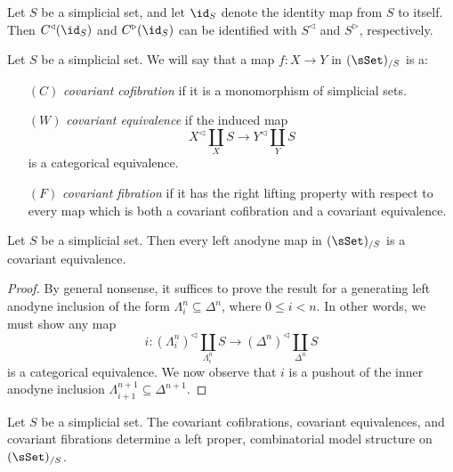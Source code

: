 \begin{example}
Let $S$ be a simplicial set, and let $\id_{S}$ denote the identity map from $S$ to itself.
Then $C^{\triangleleft}(\id_S)$ and $C^{\triangleright}(\id_S)$ can be identified with
$S^{\triangleleft}$ and $S^{\triangleright}$, respectively.
\end{example}

\begin{definition}
Let $S$ be a simplicial set. We will say that a map $f: X \rightarrow Y$ in $(\sSet)_{/S}$ is
a:
\begin{itemize}
\item[$(C)$] {\it covariant cofibration} if it is a monomorphism of simplicial sets.
\item[$(W)$] {\it covariant equivalence} if the induced map
$$ X^{\triangleleft} \coprod_{X} S \rightarrow Y^{\triangleleft} \coprod_{Y} S $$
is a categorical equivalence.
\item[$(F)$] {\it covariant fibration} if it has the right lifting property with respect to every map
which is both a covariant cofibration and a covariant equivalence.
\end{itemize}
\end{definition}

\begin{lemma}\label{onehalff}
Let $S$ be a simplicial set. Then every left anodyne map in $(\sSet)_{/S}$ is a covariant
equivalence.
\end{lemma}

\begin{proof}
By general nonsense, it suffices to prove the result for a generating left anodyne inclusion of the form $\Lambda^n_i \subseteq \Delta^n$, where $0 \leq i < n$. In other words, we must show any map
$$ i: ( \Lambda^n_i)^{\triangleleft} \coprod_{ \Lambda^n_i} S \rightarrow (\Delta^n)^{\triangleleft} \coprod_{ \Delta^n} S$$
is a categorical equivalence. We now observe that $i$ is a pushout of the inner anodyne inclusion
$\Lambda^{n+1}_{i+1} \subseteq \Delta^{n+1}$.
\end{proof}

\begin{proposition}\label{covcech}
Let $S$ be a simplicial set. The covariant cofibrations, covariant equivalences, and covariant fibrations determine a left proper, combinatorial model structure on $(\sSet)_{/S}$.
\end{proposition}

